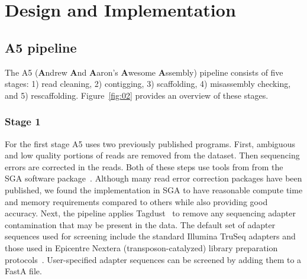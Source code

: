\documentclass[10pt]{article}
\begin{document}
\section*{Design and Implementation}

\subsection*{A5 pipeline}

The A5 (\textbf{A}ndrew \textbf{A}nd \textbf{A}aron's \textbf{A}wesome \textbf{A}ssembly) pipeline consists of five 
stages: 1) read cleaning, 2) contigging, 3) scaffolding, 4) misassembly checking, and 5) rescaffolding. 
Figure~\ref{fig:02} provides an overview of these stages. 

\subsubsection*{Stage 1}
For the first stage A5 uses two previously published programs. First, 
ambiguous and low quality portions of reads are removed from the dataset. Then sequencing errors are corrected in the reads. Both of these 
steps use tools from from the SGA software package~\cite{Simpson2010}.  Although many read error correction packages have been published,
we found the implementation in SGA to have reasonable compute time and memory requirements compared to others while also providing 
good accuracy.  Next, the pipeline applies Tagdust~\cite{Lassmann2009} to remove any 
sequencing adapter contamination that may be present in the data. The default set of adapter sequences used for screening
include the standard Illumina TruSeq adapters and those used in Epicentre Nextera (transposon-catalyzed) library preparation protocols~\cite{Adey2010}. 
User-specified adapter sequences can be screened by adding them to a FastA file. 
\end{document}
